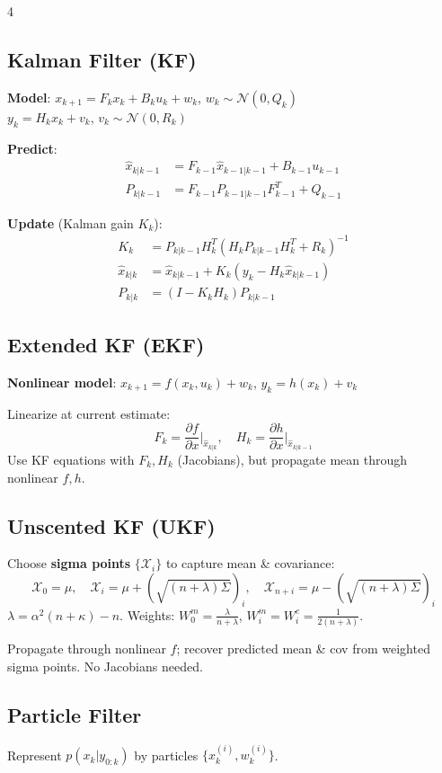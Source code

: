 \documentclass[8pt,landscape]{article}
\begin{document}
\begin{multicols}{4}
\subsection{Kalman Filter (KF)}
\textbf{Model}: $x_{k+1}=F_k x_k+B_k u_k+w_k$, $w_k\sim\mathcal{N}(0,Q_k)$\\
\phantom{Model:} $y_k=H_k x_k+v_k$, $v_k\sim\mathcal{N}(0,R_k)$

\textbf{Predict}:
\begin{align*}
\hat{x}_{k|k-1} &= F_{k-1}\hat{x}_{k-1|k-1}+B_{k-1}u_{k-1}\\
P_{k|k-1} &= F_{k-1}P_{k-1|k-1}F_{k-1}^T + Q_{k-1}
\end{align*}

\textbf{Update} (Kalman gain $K_k$):
\begin{align*}
K_k &= P_{k|k-1}H_k^T(H_kP_{k|k-1}H_k^T+R_k)^{-1}\\
\hat{x}_{k|k} &= \hat{x}_{k|k-1}+K_k(y_k-H_k\hat{x}_{k|k-1})\\
P_{k|k} &= (I-K_kH_k)P_{k|k-1}
\end{align*}

\subsection{Extended KF (EKF)}
\textbf{Nonlinear model}: $x_{k+1}=f(x_k,u_k)+w_k$, $y_k=h(x_k)+v_k$

Linearize at current estimate:
\[ F_k=\frac{\partial f}{\partial x}\bigg|_{\hat{x}_{k|k}},\quad H_k=\frac{\partial h}{\partial x}\bigg|_{\hat{x}_{k|k-1}} \]
Use KF equations with $F_k,H_k$ (Jacobians), but propagate mean through nonlinear $f,h$.

\subsection{Unscented KF (UKF)}
Choose \textbf{sigma points} $\{\mathcal{X}_i\}$ to capture mean \& covariance:
\[\mathcal{X}_0=\mu,\quad \mathcal{X}_{i}=\mu+(\sqrt{(n+\lambda)\Sigma})_i,\quad \mathcal{X}_{n+i}=\mu-(\sqrt{(n+\lambda)\Sigma})_i\]
$\lambda=\alpha^2(n+\kappa)-n$. Weights: $W_0^m=\frac{\lambda}{n+\lambda}$, $W_i^m=W_i^c=\frac{1}{2(n+\lambda)}$.

Propagate through nonlinear $f$; recover predicted mean \& cov from weighted sigma points. No Jacobians needed.

\subsection{Particle Filter}
Represent $p(x_k|y_{0:k})$ by particles $\{x_k^{(i)},w_k^{(i)}\}$.


\end{multicols}
\end{document}
